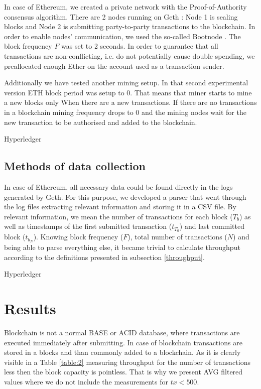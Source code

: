 \documentclass[12pt]{article}
\begin{document}
In case of Ethereum, we created a private network with the Proof-of-Authority consensus algorithm. There are 2 nodes running on Geth \cite{geth}: Node 1 is sealing blocks and Node 2 is submitting party-to-party transactions to the blockchain. In order to enable nodes’ communication, we used the so-called Bootnode \cite{bootnode}. The block frequency $F$ was set to 2 seconds. In order to guarantee that all transactions are non-conflicting, i.e. do not potentially cause double spending, we preallocated enough Ether on the account used as a transaction sender.

Additionally we have tested another mining setup. In that second experimental version ETH block period was setup to 0. That means that miner starts to mine a new blocks only When there are a new transactions. If there are no transactions in a blockchain mining frequency drops to 0 and the mining nodes wait for the new transaction to be authorised and added to the blockchain. 

{\color{red} Hyperledger}



\subsection{Methods of data collection}
In case of Ethereum, all necessary data could be found directly in the logs generated by Geth. For this purpose, we developed a parser that went through the log files extracting relevant information and storing it in a CSV file. By relevant information, we mean the number of transactions for each block ($T_b$) as well as timestamps of the first submitted transaction ($t_{T_0}$) and last committed block ($t_{b_N}$). Knowing block frequency ($F$), total number of transactions ($N$) and being able to parse everything else, it became trivial to calculate throughput according to the definitions presented in subsection \ref{throughput}.

{\color{red} Hyperledger}



\section{Results}

 Blockchain is not a normal BASE or ACID database, where transactions are executed immediately after submitting. In case of blockchain transactions are stored in a blocks and than commonly added to a blockchain.
 As it is clearly visible in a Table \ref{table:2} measuring throughput for the number of transactions less then the block capacity is pointless. That is why we present AVG filtered values where we do not include the measurements for $tx < 500$.
\end{document}
